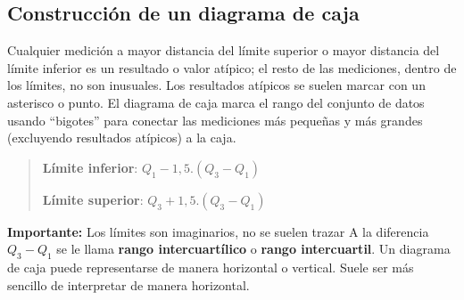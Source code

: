 \documentclass[]{article}
\begin{document}
\subsection*{Construcción de un diagrama de caja}
Cualquier medición a mayor distancia del límite superior o mayor distancia del límite inferior es un resultado o valor atípico; el resto de las mediciones, dentro de los límites, no son inusuales. Los resultados atípicos se suelen marcar con un asterisco o punto. El diagrama de caja marca el rango del conjunto de datos usando “bigotes” para conectar las mediciones más pequeñas y más grandes (excluyendo resultados atípicos) a la caja.
\begin{quote}
	\textbf{Límite inferior}: $Q_{1} - 1,5.(Q_{3} - Q_{1})$
	\item \textbf{Límite superior}: $Q_{3} + 1,5.(Q_{3} - Q_{1})$
\end{quote}
\textbf{Importante: }Los límites son imaginarios, no se suelen trazar
A la diferencia \textbf{$Q_{3} - Q_{1}$} se le llama \textbf{rango intercuartílico} o \textbf{rango intercuartil}.
Un diagrama de caja puede representarse de manera horizontal o vertical. Suele ser más sencillo de interpretar de manera horizontal.
\end{document}
